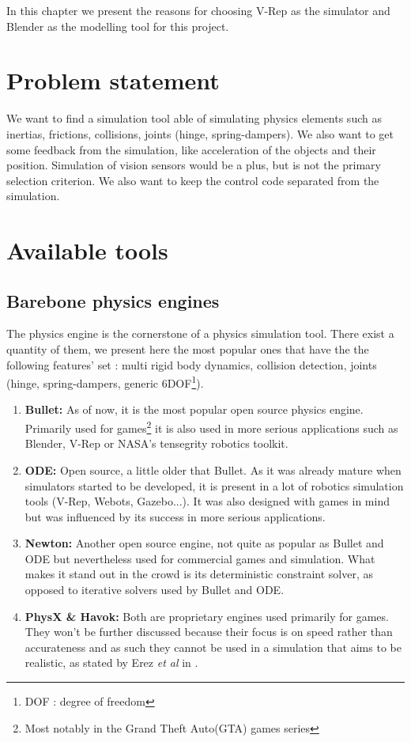 In this chapter we present the reasons for choosing V-Rep as the simulator and Blender as the modelling tool for this project. 

\section{Problem statement} 
We want to find a simulation tool able of simulating physics elements such as inertias, frictions, collisions, joints (hinge, spring-dampers). We also want to get some feedback from the simulation, like acceleration of the objects and their position. Simulation of vision sensors would be a plus, but is not the primary selection criterion. We also want to keep the control code separated from the simulation.

\section{Available tools}
\subsection{Barebone physics engines}
The physics engine is the cornerstone of a physics simulation tool. There exist a quantity of them, we present here the most popular ones that have the the following features' set :  multi rigid body dynamics, collision detection, joints (hinge, spring-dampers, generic 6DOF\footnote{DOF : degree of freedom}). 

\begin{enumerate}
\item \textbf{Bullet:} As of now, it is the most popular open source physics engine. Primarily used for games\footnote{Most notably in the Grand Theft Auto(GTA) games series} it is also used in more serious applications such as Blender, V-Rep or NASA's tensegrity robotics toolkit. 

\item \textbf{ODE:} Open source, a little older that Bullet. As it was already mature when simulators started to be developed, it is present in a lot of robotics simulation tools (V-Rep, Webots, Gazebo...). It was also designed with games in mind but was influenced by its success in more serious applications.

\item \textbf{Newton:} Another open source engine, not quite as popular as Bullet and ODE but nevertheless used for commercial games and simulation. What makes it stand out in the crowd is its deterministic constraint solver, as opposed to iterative solvers used by Bullet and ODE.

\item \textbf{PhysX \& Havok:} Both are proprietary engines used primarily for games. They won't be further discussed because their focus is on speed rather than accurateness and as such they cannot be used in a simulation that aims to be realistic, as stated by Erez \textit{et al} in \cite{engines_comparison}.
\end{enumerate}

